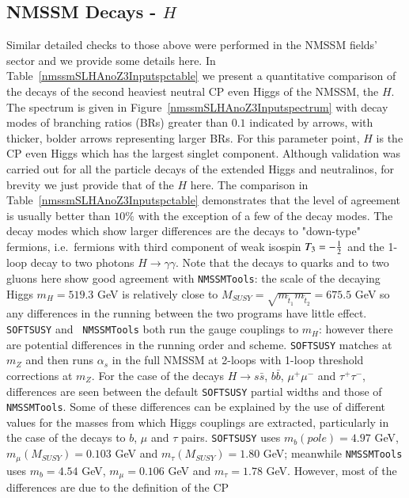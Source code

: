 \documentclass[final,3p,times,pdflatex]{elsarticle}
\begin{document}
\subsection{NMSSM Decays - $H$}

Similar detailed checks to those above were performed in the NMSSM fields'
sector and 
we provide some 
details here. In Table~\ref{nmssmSLHAnoZ3Inputspctable} we
present a quantitative comparison of the decays of the second heaviest neutral
CP 
even Higgs of the NMSSM, the $H$. The spectrum is given in
Figure~\ref{nmssmSLHAnoZ3Inputspectrum} with decay modes of branching ratios
(BRs) greater than $0.1$ indicated by arrows, with thicker, bolder arrows
representing larger BRs. For this parameter point, $H$ is the CP even Higgs
which has the largest singlet component. Although validation was carried out
for all the 
particle decays of 
the extended Higgs and neutralinos, for brevity we just provide that of the
$H$ here. 
The comparison in Table~\ref{nmssmSLHAnoZ3Inputspctable} demonstrates that the
level of 
agreement is usually better than $10\%$ with the
exception of a few of the decay modes. The decay modes which show larger
differences are the decays to "down-type" fermions, i.e.\ fermions with third
component of weak isospin $T_3 = -{1 \over 2}$ and the 1-loop decay to two
photons $H \rightarrow \gamma \gamma$. 
Note that the decays to quarks and to two
gluons here show good agreement with {\tt NMSSMTools}: the scale of the
decaying 
Higgs $m_H = 519.3$ GeV is relatively close to $M_{SUSY} =
\sqrt{m_{\tilde{t}_1}m_{\tilde{t}_2}} = 675.5$ GeV so any differences in the
running between the two programs have little effect. 
{\tt SOFTSUSY} and {\tt
  NMSSMTools} both run the gauge couplings to $m_H$: however there are
potential differences in the running order and 
scheme. {\tt SOFTSUSY} matches at $m_Z$ and then runs $\alpha_s$ in the full
NMSSM at 2-loops with 1-loop threshold corrections at $m_Z$. 
For the case of
the decays $H \rightarrow s \bar{s}$, $b \bar{b}$, $\mu^+ \mu^-$ and $\tau^+
\tau^-$, differences are seen between the default {\tt SOFTSUSY} 
partial widths and those of {\tt NMSSMTools}. Some of these differences can be
explained by the use of different values for the masses from which Higgs
couplings are extracted, particularly in the case
of the decays to $b$, $\mu$ 
and $\tau$ pairs. {\tt SOFTSUSY} uses $m_b(pole) = 4.97$ GeV, $m_{\mu}(M_{SUSY}) =
0.103$ GeV and $m_{\tau}(M_{SUSY}) = 1.80$ GeV; meanwhile {\tt NMSSMTools} uses
$m_b = 4.54$ GeV, $m_{\mu} = 0.106$ GeV and $m_{\tau} = 1.78$ GeV. However,
most of the differences are due to the definition of the CP 
\end{document}
